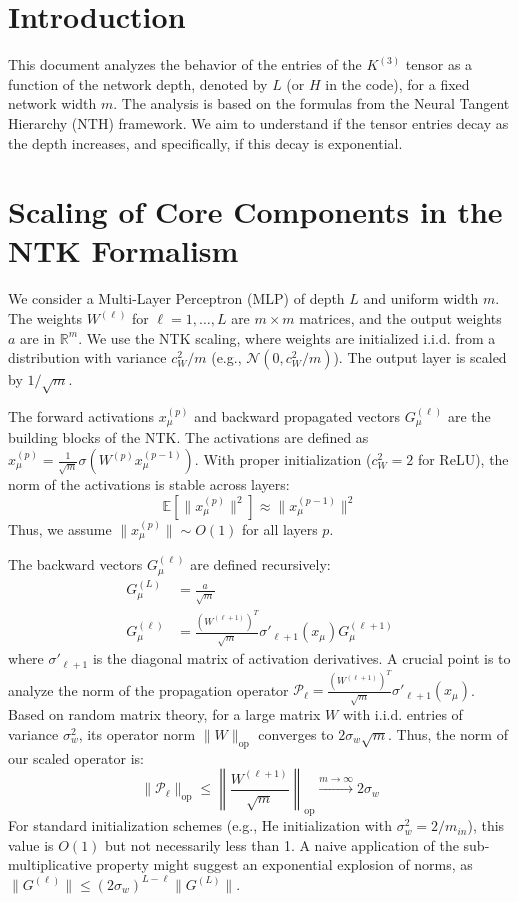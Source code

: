 \documentclass[a4paper]{article}
\begin{document}
\section{Introduction}

This document analyzes the behavior of the entries of the $K^{(3)}$ tensor as a function of the network depth, denoted by $L$ (or $H$ in the code), for a fixed network width $m$. The analysis is based on the formulas from the Neural Tangent Hierarchy (NTH) framework. We aim to understand if the tensor entries decay as the depth increases, and specifically, if this decay is exponential.

\section{Scaling of Core Components in the NTK Formalism}

We consider a Multi-Layer Perceptron (MLP) of depth $L$ and uniform width $m$. The weights $W^{(\ell)}$ for $\ell=1, \dots, L$ are $m \times m$ matrices, and the output weights $a$ are in $\mathbb{R}^m$. We use the NTK scaling, where weights are initialized i.i.d. from a distribution with variance $c_W^2/m$ (e.g., $\mathcal{N}(0, c_W^2/m)$). The output layer is scaled by $1/\sqrt{m}$.

The forward activations $x^{(p)}_\mu$ and backward propagated vectors $G^{(\ell)}_\mu$ are the building blocks of the NTK.
The activations are defined as $x^{(p)}_\mu = \frac{1}{\sqrt{m}}\sigma(W^{(p)} x^{(p-1)}_\mu)$. With proper initialization ($c_W^2=2$ for ReLU), the norm of the activations is stable across layers:
\begin{equation}
    \mathbb{E}[\|x^{(p)}_\mu\|^2] \approx \|x^{(p-1)}_\mu\|^2
\end{equation}
Thus, we assume $\|x^{(p)}_\mu\| \sim O(1)$ for all layers $p$.

The backward vectors $G^{(\ell)}_\mu$ are defined recursively:
\begin{align}
    G^{(L)}_\mu &= \frac{a}{\sqrt{m}} \\
    G^{(\ell)}_\mu &= \frac{(W^{(\ell+1)})^T}{\sqrt{m}} \sigma'_{\ell+1}(x_\mu) G^{(\ell+1)}_\mu
\end{align}
where $\sigma'_{\ell+1}$ is the diagonal matrix of activation derivatives. A crucial point is to analyze the norm of the propagation operator $\mathcal{P}_\ell = \frac{(W^{(\ell+1)})^T}{\sqrt{m}} \sigma'_{\ell+1}(x_\mu)$. Based on random matrix theory, for a large matrix $W$ with i.i.d. entries of variance $\sigma_w^2$, its operator norm $\|W\|_{\text{op}}$ converges to $2\sigma_w\sqrt{m}$. Thus, the norm of our scaled operator is:
\begin{equation}
    \|\mathcal{P}_\ell\|_{\text{op}} \le \left\| \frac{W^{(\ell+1)}}{\sqrt{m}} \right\|_{\text{op}} \xrightarrow{m\to\infty} 2\sigma_w
\end{equation}
For standard initialization schemes (e.g., He initialization with $\sigma_w^2=2/m_{in}$), this value is $O(1)$ but not necessarily less than 1. A naive application of the sub-multiplicative property might suggest an exponential explosion of norms, as $\|G^{(\ell)}\| \le (2\sigma_w)^{L-\ell} \|G^{(L)}\|$.
\end{document}
